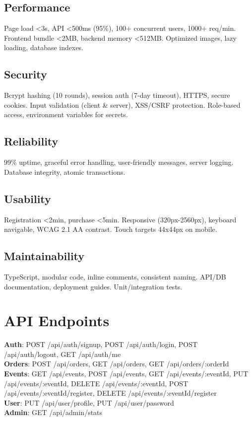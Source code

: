 \documentclass[10pt]{article}
\begin{document}
\subsection{Performance}
Page load <3s, API <500ms (95\%), 100+ concurrent users, 1000+ req/min. Frontend bundle <2MB, backend memory <512MB. Optimized images, lazy loading, database indexes.

\subsection{Security}
Bcrypt hashing (10 rounds), session auth (7-day timeout), HTTPS, secure cookies. Input validation (client \& server), XSS/CSRF protection. Role-based access, environment variables for secrets.

\subsection{Reliability}
99\% uptime, graceful error handling, user-friendly messages, server logging. Database integrity, atomic transactions.

\subsection{Usability}
Registration <2min, purchase <5min. Responsive (320px-2560px), keyboard navigable, WCAG 2.1 AA contrast. Touch targets 44x44px on mobile.

\subsection{Maintainability}
TypeScript, modular code, inline comments, consistent naming. API/DB documentation, deployment guides. Unit/integration tests.

\section{API Endpoints}

\textbf{Auth}: POST /api/auth/signup, POST /api/auth/login, POST /api/auth/logout, GET /api/auth/me\\
\textbf{Orders}: POST /api/orders, GET /api/orders, GET /api/orders/:orderId\\
\textbf{Events}: GET /api/events, POST /api/events, GET /api/events/:eventId, PUT /api/events/:eventId, DELETE /api/events/:eventId, POST /api/events/:eventId/register, DELETE /api/events/:eventId/register\\
\textbf{User}: PUT /api/user/profile, PUT /api/user/password\\
\textbf{Admin}: GET /api/admin/stats
\end{document}
